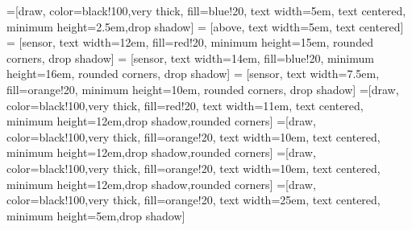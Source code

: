 \documentclass{article}
\begin{document}

=[draw, color=black!100,very thick, fill=blue!20, text width=5em, text centered, minimum height=2.5em,drop shadow]
 = [above, text width=5em, text centered]
 = [sensor, text width=12em, fill=red!20, 
    minimum height=15em, rounded corners, drop shadow]
 = [sensor, text width=14em, fill=blue!20, 
    minimum height=16em, rounded corners, drop shadow]
 = [sensor, text width=7.5em, fill=orange!20, 
    minimum height=10em, rounded corners, drop shadow]
=[draw, color=black!100,very thick, fill=red!20, text width=11em, text centered, minimum height=12em,drop shadow,rounded corners]
=[draw, color=black!100,very thick, fill=orange!20, text width=10em, 
text centered, minimum height=12em,drop shadow,rounded corners]
=[draw, color=black!100,very thick, fill=orange!20, text width=10em, 
text centered, minimum height=12em,drop shadow,rounded corners]
=[draw, color=black!100,very thick, fill=orange!20, text width=25em, 
text centered, minimum height=5em,drop shadow]

\def\blockdist{2.3}
\def\edgedist{2.5}
\end{document}
